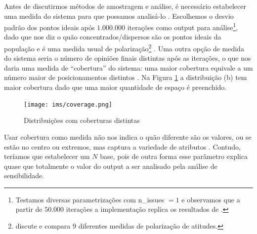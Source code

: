     Antes de discutirmos métodos de amostragem e análise, é necessário
    estabelecer uma medida do sistema para que possamos analisá-lo
    \cite{railsback2012agent}. Escolhemos o desvio padrão dos pontos ideais após
    \(1.000.000\) iterações como output para análise\footnote{Testamos diversas
      parametrizações com n\_issues \(= 1\) e observamos que a partir de
      \(50.000\) iterações a implementação replica os resultados de
      .}, dado que nos diz o quão
    concentrados/dispersos são os pontos ideais da população e é uma medida
    usual de polarização\footnote{ discute
      e compara 9 diferentes medidas de polarização de atitudes.}
    \cite{bramson2016disambiguation}. Uma outra opção de medida do sistema seria
    o número de opiniões finais distintas após as iterações, o que nos daria uma
    medida de ``cobertura'' do sistema: uma maior cobertura equivale a um número
    maior de posicionamentos distintos \cite{bramson2016disambiguation}. Na
    Figura \ref{fig:coverage} a distribuição (b) tem maior cobertura dado que
    uma maior quantidade de espaço é preenchido.
    
    \begin{figure}[H]
      \centering
      \texttt{[image: ims/coverage.png]}
      \caption{Distribuições com coberturas distintas}
      \label{fig:coverage}
    \end{figure}

    
    Usar cobertura como medida não nos indica
    o quão diferente são os valores, ou se estão no centro ou extremos, mas
    captura a variedade de atributos \cite[p.85]{bramson2016disambiguation}.
    Contudo, teríamos que estabelecer um \(N\) base, pois de outra forma esse
    parâmetro explica quase que totalmente o valor do output a ser analisado
    pela análise de sensibilidade.
    
